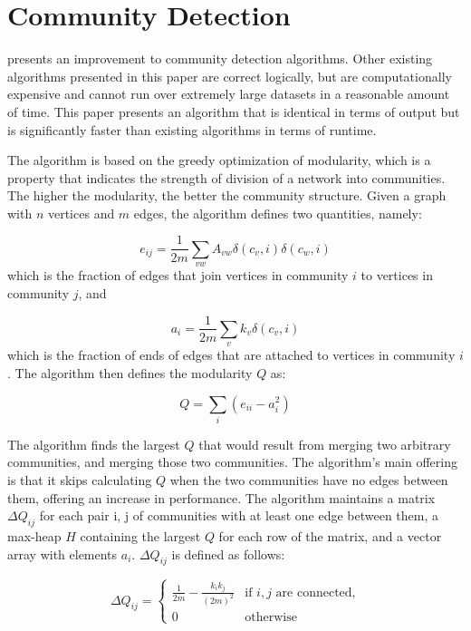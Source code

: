 \section{Community Detection}
\label{sec:commdet}


 presents an improvement to community detection algorithms. Other existing algorithms presented in this paper are correct logically, but are computationally expensive and cannot run over extremely large datasets in a reasonable amount of time. This paper presents an algorithm that is identical in terms of output but is significantly faster than existing algorithms in terms of runtime.


The algorithm is based on the greedy optimization of modularity, which is a property that indicates the strength of division of a network into communities. The higher the modularity, the better the community structure. Given a graph with $n$ vertices and $m$ edges, the algorithm defines two quantities, namely:


\begin{equation}
e_{ij} = \frac{1}{2m} \sum_{vw}{A_{vw}\delta(c_v,i)\delta(c_w,i)}
\end{equation}which is the fraction of edges that join vertices in community $i$ to vertices in community $j$, and


\begin{equation}
a_i = \frac{1}{2m} \sum_{v}{k_v\delta(c_v,i)}
\end{equation}which is the fraction of ends of edges that are attached to vertices in community $i$. The algorithm then defines the modularity $Q$ as:


\begin{equation}
Q = \sum_{i}({e_{ii}-a_i^2})
\end{equation}


The algorithm finds the largest $Q$ that would result from merging two arbitrary communities, and merging those two communities. The algorithm's main offering is that it skips calculating $Q$ when the two communities have no edges between them, offering an increase in performance. The algorithm maintains a matrix $\Delta Q_{ij}$ for each pair i, j of communities with at least one edge between them, a max-heap $H$ containing the largest $Q$ for each row of the matrix, and a vector array with elements $a_{i}$. $\Delta Q_{ij}$ is defined as follows:


\begin{equation}
\Delta Q_{ij} =
\begin {cases}
\frac{1}{2m}-\frac{k_ik_j}{(2m)^2} &\text{if }i, j\text{ are connected,}
\\ 0 & \text{otherwise}
\end{cases}
\end{equation}



